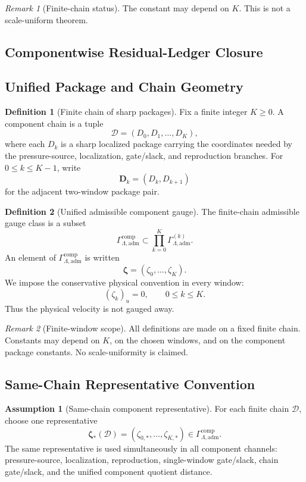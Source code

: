 \documentclass[11pt]{article}
\numberwithin{equation}{section}
\theoremstyle{definition}
\newtheorem{definition}[definition]{Definition}
\newtheorem{assumption}[assumption]{Assumption}
\theoremstyle{remark}
\newtheorem{remark}[remark]{Remark}
\newcommand{\adm}{\mathrm{adm}}
\newcommand{\comp}{\mathrm{comp}}
\newcommand{\calD}{\mathcal D}
\newcommand{\bfD}{\mathbf D}
\newcommand{\bzeta}{\boldsymbol\zeta}
\newcommand{\Gcomp}{\Gamma_{\Lambda,\adm}^{\comp}}
\begin{document}
\begin{remark}[Finite-chain status]
The constant may depend on \(K\).  This is not a scale-uniform theorem.
\end{remark}

\subsection*{Componentwise Residual-Ledger Closure}
\subsection{Unified Package and Chain Geometry}
\label{comp:sec:geometry}

\begin{definition}[Finite chain of sharp packages]
\label{comp:def:finite-chain}
Fix a finite integer \(K\ge0\).  A component chain is a tuple
\[
    \calD=(D_0,D_1,\ldots,D_K),
\]
where each \(D_k\) is a sharp localized package carrying the coordinates needed
by the pressure-source, localization, gate/slack, and reproduction branches.
For \(0\le k\le K-1\), write
\[
    \bfD_k=(D_k,D_{k+1})
\]
for the adjacent two-window package pair.
\end{definition}

\begin{definition}[Unified admissible component gauge]
\label{comp:def:component-gauge}
The finite-chain admissible gauge class is a subset
\[
    \Gcomp
    \subset
    \prod_{k=0}^{K}\Gamma_{\Lambda,\adm}^{(k)}.
\]
An element of \(\Gcomp\) is written
\[
    \bzeta=(\zeta_0,\ldots,\zeta_K).
\]
We impose the conservative physical convention in every window:
\[
    (\zeta_k)_u=0,
    \qquad 0\le k\le K.
\]
Thus the physical velocity is not gauged away.
\end{definition}

\begin{remark}[Finite-window scope]
All definitions are made on a fixed finite chain.  Constants may depend on
\(K\), on the chosen windows, and on the component package constants.  No
scale-uniformity is claimed.
\end{remark}

\subsection{Same-Chain Representative Convention}
\label{comp:sec:same-chain}

\begin{assumption}[Same-chain component representative]
\label{comp:ass:same-chain-representative}
For each finite chain \(\calD\), choose one representative
\[
    \bzeta_*(\calD)
    =
    (\zeta_{0,*},\ldots,\zeta_{K,*})
    \in
    \Gcomp.
\]
The same representative is used simultaneously in all component channels:
pressure-source, localization, reproduction, single-window gate/slack, chain
gate/slack, and the unified component quotient distance.
\end{assumption}
\end{document}
